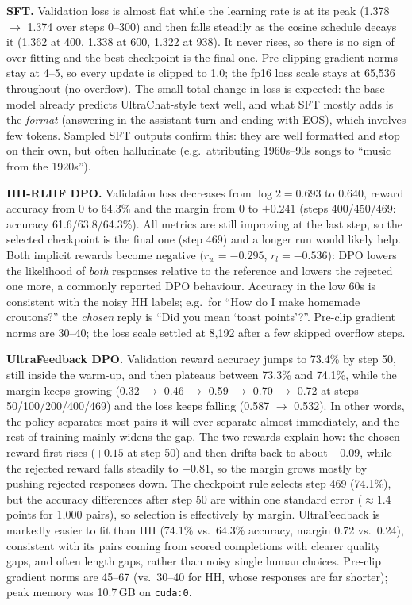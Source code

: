 \documentclass[10pt]{article}
\begin{document}
\textbf{SFT.} Validation loss is almost flat while the learning rate is at its peak
(1.378 $\rightarrow$ 1.374 over steps 0--300) and then falls steadily as the cosine schedule decays it
(1.362 at 400, 1.338 at 600, 1.322 at 938). It never rises, so there is no sign of over-fitting
and the best checkpoint is the final one. Pre-clipping gradient norms stay at 4--5, so every update
is clipped to 1.0; the fp16 loss scale stays at 65{,}536 throughout (no overflow). The small total
change in loss is expected: the base model already predicts UltraChat-style text well, and what SFT
mostly adds is the \emph{format} (answering in the assistant turn and ending with EOS), which
involves few tokens. Sampled SFT outputs confirm this: they are well formatted and stop on their
own, but often hallucinate (e.g.\ attributing 1960s--90s songs to ``music from the 1920s'').

\textbf{HH-RLHF DPO.} Validation loss decreases from $\log 2 = 0.693$ to 0.640, reward accuracy
from 0 to 64.3\% and the margin from 0 to $+0.241$ (steps 400/450/469: accuracy 61.6/63.8/64.3\%).
All metrics are still improving at the last step, so the selected checkpoint is the final one
(step 469) and a longer run would likely help. Both implicit rewards become negative
($r_w=-0.295$, $r_l=-0.536$): DPO lowers the likelihood of \emph{both} responses relative to the
reference and lowers the rejected one more, a commonly reported DPO behaviour. Accuracy in the
low 60s is consistent with the noisy HH labels; e.g.\ for ``How do I make homemade croutons?'' the
\emph{chosen} reply is ``Did you mean `toast points'?''. Pre-clip gradient norms are 30--40; the loss
scale settled at 8{,}192 after a few skipped overflow steps.

\textbf{UltraFeedback DPO.} Validation reward accuracy jumps to 73.4\% by step 50, still inside the
warm-up, and then plateaus between 73.3\% and 74.1\%, while the margin keeps growing
(0.32 $\rightarrow$ 0.46 $\rightarrow$ 0.59 $\rightarrow$ 0.70 $\rightarrow$ 0.72 at steps 50/100/200/400/469)
and the loss keeps falling (0.587 $\rightarrow$ 0.532). In other words, the policy separates most
pairs it will ever separate almost immediately, and the rest of training mainly widens the gap.
The two rewards explain how: the chosen reward first rises ($+0.15$ at step 50) and then drifts back
to about $-0.09$, while the rejected reward falls steadily to $-0.81$, so the margin grows mostly by
pushing rejected responses down. The checkpoint rule selects step 469 (74.1\%), but the accuracy
differences after step 50 are within one standard error ($\approx$1.4 points for 1{,}000 pairs), so
selection is effectively by margin. UltraFeedback is markedly easier to fit than HH (74.1\% vs.\
64.3\% accuracy, margin 0.72 vs.\ 0.24), consistent with its pairs coming from scored completions
with clearer quality gaps, and often length gaps, rather than noisy single human choices.
Pre-clip gradient norms are 45--67 (vs.\ 30--40 for HH, whose responses are far shorter);
peak memory was 10.7\,GB on \texttt{cuda:0}.
\end{document}
